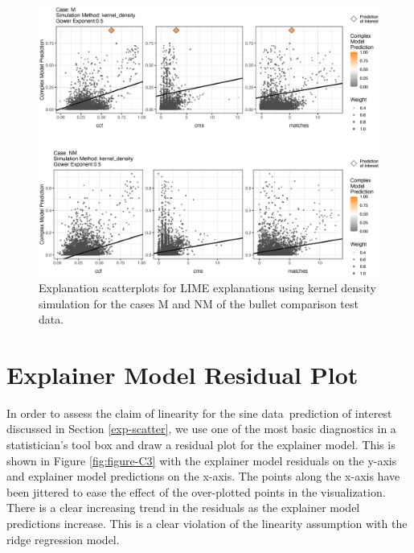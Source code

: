 \documentclass[AMS,STIX2COL]{WileyNJD-v2}\usepackage[]{graphicx}\usepackage[]{color}
\newenvironment{knitrout}{}{} %
\newcommand{\data}{sine data}
\begin{document}
\begin{figure}[!thp]
\begin{knitrout}
\color{fgcolor}

{\centering \includegraphics[width=6.5in]{figure-B2-1} 

}



\end{knitrout}
\caption{Explanation scatterplots for LIME explanations using kernel density simulation for the cases M and NM of the bullet comparison test data.}
\label{fig:figure-B2}
\end{figure}

\section{Explainer Model Residual Plot} \label{residual-plot}

In order to assess the claim of linearity for the \data \ prediction of interest discussed in Section \ref{exp-scatter}, we use one of the most basic diagnostics in a statistician's tool box and draw a residual plot for the explainer model. This is shown in Figure \ref{fig:figure-C3} with the explainer model residuals on the y-axis and explainer model predictions on the x-axis. The points along the x-axis have been jittered to ease the effect of the over-plotted points in the visualization. There is a clear increasing trend in the residuals as the explainer model predictions increase. This is a clear violation of the linearity assumption with the ridge regression model.
\end{document}
